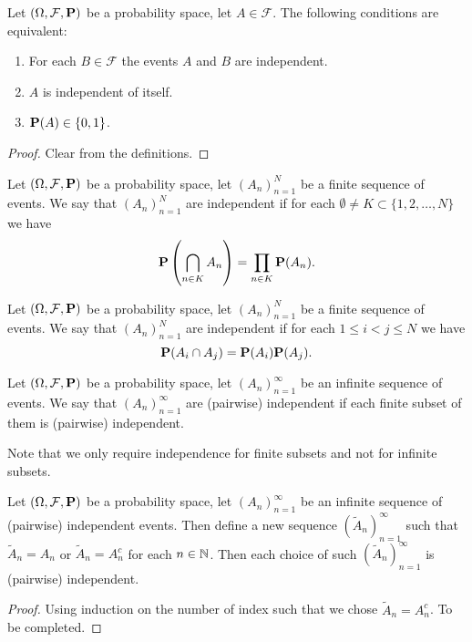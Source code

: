 \documentclass[11pt,a4paper]{article}
\begin{document}
  \begin{proposition}
    Let $(\Omega, \mathcal F, \mathbf{P})$ be a probability space,
    let $A \in \mathcal F$. The following conditions are equivalent:
    \begin{enumerate}
      \item For each $B \in \mathcal F$ the events $A$ and $B$ are independent.
      \item $A$ is independent of itself.
      \item $\mathbf{P}(A) \in \{0, 1\}$.
    \end{enumerate}
  \end{proposition}
  \begin{proof}
    Clear from the definitions.
  \end{proof}
  
  \begin{definition}[Independence]
    Let $(\Omega, \mathcal F, \mathbf{P})$ be a probability space,
    let $(A_n)_{n=1}^{N}$ be a finite sequence of events.
    We say that $(A_n)_{n=1}^{N}$ are independent if for each 
    $\emptyset \neq K \subset \{1,2,\dots,N\}$ we have
    \[
      \mathbf{P}\left(\bigcap_{n \in K} A_n\right) = 
      \prod_{n \in K} \mathbf{P}(A_n).
    \]
  \end{definition}

  \begin{definition}
    Let $(\Omega, \mathcal F, \mathbf{P})$ be a probability space,
    let $(A_n)_{n=1}^{N}$ be a finite sequence of events.
    We say that $(A_n)_{n=1}^{N}$ are independent if for each 
    $1 \le i < j \le N$ we have
    \[
      \mathbf{P}(A_i \cap A_j) = 
      \mathbf{P}(A_i) \mathbf{P}(A_j).
    \]
  \end{definition}

  \begin{definition}
    Let $(\Omega, \mathcal F, \mathbf{P})$ be a probability space,
    let $(A_n)_{n=1}^{\infty}$ be an infinite sequence of events.
    We say that $(A_n)_{n=1}^{\infty}$ are (pairwise) independent if each
    finite subset of them is (pairwise) independent.
  \end{definition}

  Note that we only require independence for finite subsets and not for
  infinite subsets.

  \begin{proposition}\label{prop:indp}
    Let $(\Omega, \mathcal F, \mathbf{P})$ be a probability space,
    let $(A_n)_{n=1}^{\infty}$ be an infinite sequence of  (pairwise) 
    independent events. Then define a new sequence 
    $(\widetilde{A}_n)_{n=1}^{\infty}$ such that $\widetilde{A}_n = A_n$ or
    $\widetilde{A}_n = A_n^c$ for each $n \in \mathbb{N}$. Then each choice of such
    $(\widetilde{A}_n)_{n=1}^{\infty}$ is (pairwise) independent.
  \end{proposition}
  \begin{proof}
    Using induction on the number of index such that we chose
    $\widetilde{A}_n = A_n^c$. 
    To be completed.
  \end{proof}
\end{document}
